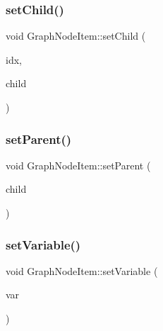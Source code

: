 \mbox{\label{class_graph_node_item_af4a71474e84768b8f97a1a923c718227}} 
\subsubsection{\texorpdfstring{setChild()}{setChild()}}
{\footnotesize\ttfamily void Graph\+Node\+Item\+::set\+Child (\begin{DoxyParamCaption}\item[{int}]{idx,  }\item[{\mbox{\hyperlink{class_graph_node_item}{Graph\+Node\+Item}} $\ast$}]{child }\end{DoxyParamCaption})\hspace{0.3cm}{\ttfamily [protected]}}

\mbox{\label{class_graph_node_item_a55f25d4ef12bed7a753e2cf6f61a120d}} 
\subsubsection{\texorpdfstring{setParent()}{setParent()}}
{\footnotesize\ttfamily void Graph\+Node\+Item\+::set\+Parent (\begin{DoxyParamCaption}\item[{\mbox{\hyperlink{class_graph_node_item}{Graph\+Node\+Item}} $\ast$}]{child }\end{DoxyParamCaption})\hspace{0.3cm}{\ttfamily [protected]}}

\mbox{\label{class_graph_node_item_ab88f062303036ac1029489dfe8adebe8}} 
\subsubsection{\texorpdfstring{setVariable()}{setVariable()}}
{\footnotesize\ttfamily void Graph\+Node\+Item\+::set\+Variable (\begin{DoxyParamCaption}\item[{\mbox{\hyperlink{namespacedtree_a79fe30831a14df904319f9e783b3189b}{dtree\+::\+Variable}}}]{var }\end{DoxyParamCaption})}

